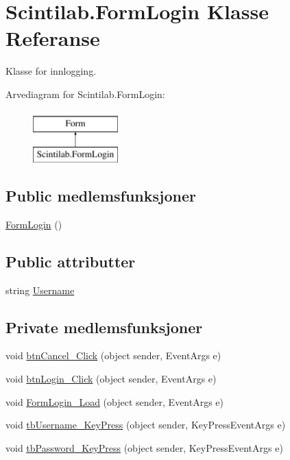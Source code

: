 \hypertarget{class_scintilab_1_1_form_login}{\section{Scintilab.\+Form\+Login Klasse Referanse}
\label{class_scintilab_1_1_form_login}
}


Klasse for innlogging.  


Arvediagram for Scintilab.\+Form\+Login\+:\begin{figure}[H]
\begin{center}
\leavevmode
\includegraphics[height=2.000000cm]{class_scintilab_1_1_form_login}
\end{center}
\end{figure}
\subsection*{Public medlemsfunksjoner}
\begin{DoxyCompactItemize}
\item 
\hyperlink{class_scintilab_1_1_form_login_a9824d4f0cf40072fcda58524b16c762d}{Form\+Login} ()
\end{DoxyCompactItemize}
\subsection*{Public attributter}
\begin{DoxyCompactItemize}
\item 
string \hyperlink{class_scintilab_1_1_form_login_aba278938a868ca382a657e0c1572a02b}{Username}
\end{DoxyCompactItemize}
\subsection*{Private medlemsfunksjoner}
\begin{DoxyCompactItemize}
\item 
void \hyperlink{class_scintilab_1_1_form_login_a90193599fc2c8ff5c7faee5851063aeb}{btn\+Cancel\+\_\+\+Click} (object sender, Event\+Args e)
\item 
void \hyperlink{class_scintilab_1_1_form_login_a207ac68d96dbc96d570484f30f1d669d}{btn\+Login\+\_\+\+Click} (object sender, Event\+Args e)
\item 
void \hyperlink{class_scintilab_1_1_form_login_aadaa84be09a645732d7beaf53abd6d89}{Form\+Login\+\_\+\+Load} (object sender, Event\+Args e)
\item 
void \hyperlink{class_scintilab_1_1_form_login_a7d992418cc7243b752c826cb9515188e}{tb\+Username\+\_\+\+Key\+Press} (object sender, Key\+Press\+Event\+Args e)
\item 
void \hyperlink{class_scintilab_1_1_form_login_a8c0c4b5c0c2994f179ff216893154fee}{tb\+Password\+\_\+\+Key\+Press} (object sender, Key\+Press\+Event\+Args e)
\end{DoxyCompactItemize}


